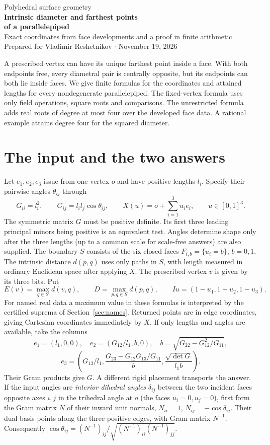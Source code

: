 \documentclass[10pt,letterpaper]{article}
\begin{document}
\thispagestyle{plain}
\begin{center}
{\large\sffamily\color{pine}Polyhedral surface geometry}\\[7pt]
{\LARGE\bfseries Intrinsic diameter and farthest points\\[3pt]
of a parallelepiped}\\[7pt]
{\normalsize Exact coordinates from face developments and a proof in finite arithmetic}\\[6pt]
{\small Prepared for Vladimir Reshetnikov \(\cdot\) November 19, 2026}
\end{center}
\noindent
A prescribed vertex can have its unique farthest point inside a face.
With both endpoints free, every diametral pair is centrally opposite,
but its endpoints can both lie inside faces. We give finite formulas
for the coordinates and attained lengths for every nondegenerate
parallelepiped. The fixed-vertex formula uses only field operations,
square roots and comparisons. The unrestricted formula adds real
roots of degree at most four over the developed face data. A rational
example attains degree four for the squared diameter.

\section{The input and the two answers}\label{sec:start}
Let $e_1,e_2,e_3$ issue from one vertex $o$ and have positive lengths
$l_i$. Specify their pairwise angles $\theta_{ij}$ through
\[
 G_{ii}=l_i^2,\qquad G_{ij}=l_i l_j\cos\theta_{ij},\qquad
 X(u)=o+\sum_{i=1}^3u_i e_i,\qquad u\in[0,1]^3 .
\]
The symmetric matrix $G$ must be positive definite. Its first three
leading principal minors being positive is an equivalent test. Angles
determine shape only after the three lengths (up to a common scale
for scale-free answers) are also supplied. The boundary
$S$ consists of the six closed faces $F_{i,b}=\{u_i=b\}$,
$b=0,1$. The intrinsic distance $d(p,q)$ uses only paths in $S$,
with length measured in ordinary Euclidean space after applying $X$.
The prescribed vertex $v$ is given by its three bits. Put
\[
 E(v)=\max_{q\in S}d(v,q),\qquad D=\max_{p,q\in S}d(p,q),\qquad
       Iu=(1-u_1,1-u_2,1-u_3).
\]
For named real data a maximum value in these formulas is interpreted
by the certified suprema of Section~\ref{sec:names}. Returned points
are in edge coordinates, giving Cartesian coordinates immediately
by $X$. If only lengths and angles are available, take the columns
\[
 e_1=(l_1,0,0),\quad e_2=(G_{12}/l_1,b,0),\quad b=\sqrt{G_{22}-G_{12}^2/G_{11}},
\]
\[
 e_3=\left(G_{13}/l_1,\frac{G_{23}-G_{12}G_{13}/G_{11}}b,
                   \frac{\sqrt{\det G}}{l_1 b}\right).
\]
Their Gram products give $G$. A different rigid placement transports
the answer. If the input angles are \emph{interior dihedral angles}
$\delta_{ij}$ between the two incident faces opposite axes $i,j$ in
the trihedral angle at $o$ (the faces $u_i=0,u_j=0$), first form
the Gram matrix $N$ of their inward unit normals, $N_{ii}=1$,
$N_{ij}=-\cos\delta_{ij}$. Their dual basis points along the three
positive edges, with Gram matrix $N^{-1}$. Consequently
$\cos\theta_{ij}=(N^{-1})_{ij}/\sqrt{(N^{-1})_{ii}(N^{-1})_{jj}}$.
\end{document}
